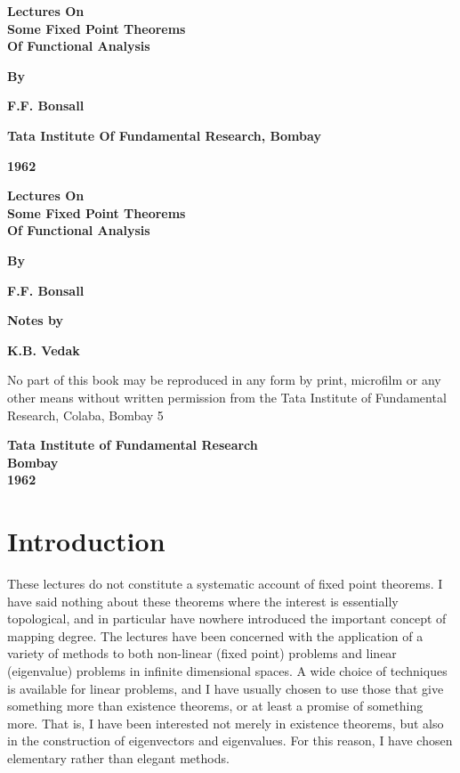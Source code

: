 \thispagestyle{empty}
\begin{center}
{\Large\bf Lectures On}\\[5pt]
{\Large\bf Some Fixed Point Theorems}\\[5pt]
{\Large\bf Of Functional Analysis}
\vskip 1cm

{\bf By}\\
\medskip

{\large\bf F.F. Bonsall}\\
\vfill

{\bf Tata Institute Of Fundamental Research, Bombay}

{\bf 1962}
\end{center}
\eject

\thispagestyle{empty}
\begin{center}
{\Large\bf Lectures On}\\[5pt]
{\Large\bf Some Fixed Point Theorems}\\[5pt]
{\Large\bf Of Functional Analysis}
\vskip 1cm

{\bf By}\\
\medskip

{\large\bf F.F. Bonsall}\\
\vfill

{\bf Notes by}\\
\medskip

{\large\bf K.B. Vedak}\\
\vfill

\parbox{0.7\textwidth}{No part of this book 
may be reproduced in any form by print, 
microfilm or any other means without written 
permission from the Tata Institute of 
Fundamental Research, Colaba, Bombay 5}
\vfill

{\bf Tata Institute of Fundamental Research}\\

{\bf Bombay}\\

{\bf 1962}
\end{center}
\eject

\thispagestyle{empty}
\chapter*{Introduction}

These lectures do not constitute a systematic account of fixed point
theorems. I have said nothing about these theorems where the interest
is essentially topological, and in particular have nowhere introduced
the important concept of mapping degree. The lectures have been
concerned with the application of a variety of methods to both
non-linear (fixed point) problems and linear (eigenvalue) problems in
infinite dimensional spaces. A wide choice of techniques is available
for linear problems, and I have usually chosen to use those that give
something more than existence theorems, or at least a promise of
something more. That is, I have been interested not merely in
existence theorems, but also in the construction of eigenvectors and
eigenvalues. For this reason, I have chosen elementary rather than
elegant methods.


